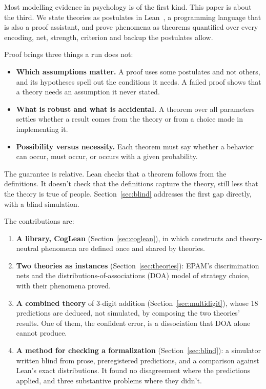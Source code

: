 \documentclass[11pt]{article}
\begin{document}
Most modelling evidence in psychology is of the first kind. This paper is about the third. We state theories as postulates in Lean~\cite{demoura2021}, a programming language that is also a proof assistant, and prove phenomena as theorems quantified over every encoding, net, strength, criterion and backup the postulates allow.

Proof brings three things a run does not:
\begin{itemize}
  \item \textbf{Which assumptions matter.} A proof uses some postulates and not others, and its hypotheses spell out the conditions it needs. A failed proof shows that a theory needs an assumption it never stated.
  \item \textbf{What is robust and what is accidental.} A theorem over all parameters settles whether a result comes from the theory or from a choice made in implementing it.
  \item \textbf{Possibility versus necessity.} Each theorem must say whether a behavior can occur, must occur, or occurs with a given probability.
\end{itemize}

The guarantee is relative. Lean checks that a theorem follows from the definitions. It doesn't check that the definitions capture the theory, still less that the theory is true of people. Section~\ref{sec:blind} addresses the first gap directly, with a blind simulation.

The contributions are:
\begin{enumerate}
  \item \textbf{A library, CogLean} (Section~\ref{sec:coglean}), in which constructs and theory-neutral phenomena are defined once and shared by theories.
  \item \textbf{Two theories as instances} (Section~\ref{sec:theories}): EPAM's discrimination nets and the distributions-of-associations (DOA) model of strategy choice, with their phenomena proved.
  \item \textbf{A combined theory} of 3-digit addition (Section~\ref{sec:multidigit}), whose 18 predictions are deduced, not simulated, by composing the two theories' results. One of them, the confident error, is a dissociation that DOA alone cannot produce.
  \item \textbf{A method for checking a formalization} (Section~\ref{sec:blind}): a simulator written blind from prose, preregistered predictions, and a comparison against Lean's exact distributions. It found no disagreement where the predictions applied, and three substantive problems where they didn't.
\end{enumerate}
\end{document}
